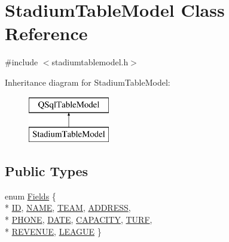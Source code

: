 \hypertarget{class_stadium_table_model}{}\section{Stadium\+Table\+Model Class Reference}
\label{class_stadium_table_model}


{\ttfamily \#include $<$stadiumtablemodel.\+h$>$}

Inheritance diagram for Stadium\+Table\+Model\+:\begin{figure}[H]
\begin{center}
\leavevmode
\includegraphics[height=2.000000cm]{class_stadium_table_model}
\end{center}
\end{figure}
\subsection*{Public Types}
\begin{DoxyCompactItemize}
\item 
enum \hyperlink{class_stadium_table_model_a424b16a0e2e9f5a5a75c022e7d4024c6}{Fields} \{ \\*
\hyperlink{class_stadium_table_model_a424b16a0e2e9f5a5a75c022e7d4024c6a4d04365bdaed0d9317978fc7c96a793c}{ID}, 
\hyperlink{class_stadium_table_model_a424b16a0e2e9f5a5a75c022e7d4024c6a4c0deadbbab13afa73f88a06d4d558da}{N\+A\+ME}, 
\hyperlink{class_stadium_table_model_a424b16a0e2e9f5a5a75c022e7d4024c6aabc647ecc94e3742c100f962928613c9}{T\+E\+AM}, 
\hyperlink{class_stadium_table_model_a424b16a0e2e9f5a5a75c022e7d4024c6a75659731ead2f2f1e142cfd188ccd914}{A\+D\+D\+R\+E\+SS}, 
\\*
\hyperlink{class_stadium_table_model_a424b16a0e2e9f5a5a75c022e7d4024c6adfdcc68b010e3b52cffaea6193f1f0fb}{P\+H\+O\+NE}, 
\hyperlink{class_stadium_table_model_a424b16a0e2e9f5a5a75c022e7d4024c6aa4bde58dc1989a25742a85e47a206129}{D\+A\+TE}, 
\hyperlink{class_stadium_table_model_a424b16a0e2e9f5a5a75c022e7d4024c6a7a4ab0f9fabfccd9ddaf68d2317f512d}{C\+A\+P\+A\+C\+I\+TY}, 
\hyperlink{class_stadium_table_model_a424b16a0e2e9f5a5a75c022e7d4024c6adf90b7a6c4a9d287c9ef1f8c2a2c38f0}{T\+U\+RF}, 
\\*
\hyperlink{class_stadium_table_model_a424b16a0e2e9f5a5a75c022e7d4024c6a06ec4a04eb9cf1d5cbef36e5f478909d}{R\+E\+V\+E\+N\+UE}, 
\hyperlink{class_stadium_table_model_a424b16a0e2e9f5a5a75c022e7d4024c6a379beec0cf9f661b52a9d268de70c4ca}{L\+E\+A\+G\+UE}
 \}
\end{DoxyCompactItemize}
